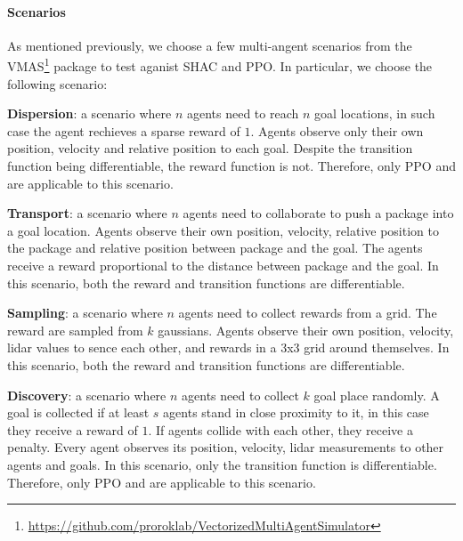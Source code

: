 \paragraph{Scenarios}
As mentioned previously, we choose a few multi-angent scenarios from the VMAS\footnote{\url{https://github.com/proroklab/VectorizedMultiAgentSimulator}} package to test \fname{} aganist SHAC and PPO. In particular, we choose the following scenario:
\begin{compactitem}
    \item \textbf{Dispersion}: a scenario where $n$ agents need to reach $n$ goal locations, in such case the agent rechieves a sparse reward of $1$. Agents observe only their own position, velocity and relative position to each goal. Despite the transition function being differentiable, the reward function is not. Therefore, only PPO and \fname{} are applicable to this scenario.
    \item \textbf{Transport}: a scenario where $n$ agents need to collaborate to push a package into a goal location. Agents observe their own position, velocity, relative position to the package and relative position between package and the goal. The agents receive a reward proportional to the distance between package and the goal. In this scenario, both the reward and transition functions are differentiable.
    \item \textbf{Sampling}: a scenario where $n$ agents need to collect rewards from a grid. The reward are sampled from $k$ gaussians. Agents observe their own position, velocity, lidar values to sence each other, and rewards in a 3x3 grid around themselves.  In this scenario, both the reward and transition functions are differentiable.
    \item \textbf{Discovery}: a scenario where $n$ agents need to collect $k$ goal place randomly. A goal is collected if at least $s$ agents stand in close proximity to it, in this case they receive a reward of $1$. If agents collide with each other, they receive a penalty. Every agent observes its position, velocity, lidar measurements to other agents and goals. In this scenario, only the transition function is differentiable. Therefore, only PPO and \fname{} are applicable to this scenario.
\end{compactitem}


